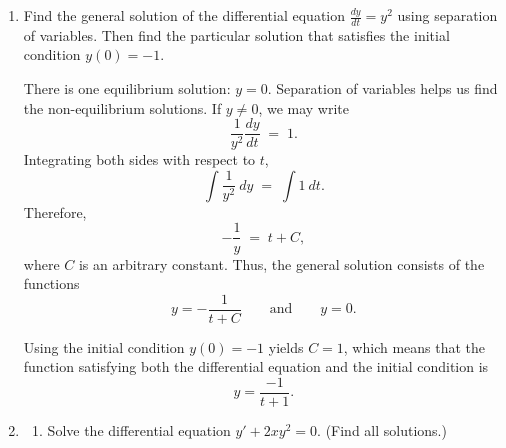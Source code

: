 \documentclass[main]{subfiles}
\begin{document}
\begin{enumerate}
\begin{solution}
\begin{itemize}
  \end{itemize}

  \end{solution}


  \item 
  
  \begin{problem}[2.25in]
  Find the general solution of the
  differential equation $\displaystyle \frac{dy}{dt} = y^2$
  using separation of variables.  Then find the particular solution that
  satisfies the initial condition $y(0) = -1$.
  \end{problem}

  \begin{solution}
  There is one equilibrium solution:  $y = 0$.  Separation of
  variables helps us find the non-equilibrium solutions.  If $y \neq 0$,
  we may write
  $$
    \frac{1}{y^2} \frac{dy}{dt} \; = \; 1.
  $$
  Integrating both sides with respect to $t$,
  $$
    \int \frac{1}{y^2}~dy \; = \; \int 1~dt.
  $$
  Therefore, 
  $$
    - \frac{1}{y} \; = \; t + C,
  $$
  where $C$ is an arbitrary constant.  Thus, the general solution
  consists of the functions
  $$
    y = - \frac{1}{t + C} \qquad \mbox{and} \qquad y = 0.
  $$

  Using the initial condition $y(0) = -1$ yields $C = 1$, which means
  that the function satisfying both the differential equation and the
  initial condition is  
  $$
    y = \frac{-1}{t + 1}.
  $$
  \end{solution}


  \item 

  
  \begin{enumerate}

  \item
  \begin{problem}[2in]
  Solve the differential equation $y' + 2x y^2 = 0$.  (Find all
  solutions.)
  \end{problem}


\end{enumerate}
\end{enumerate}
\end{document}
